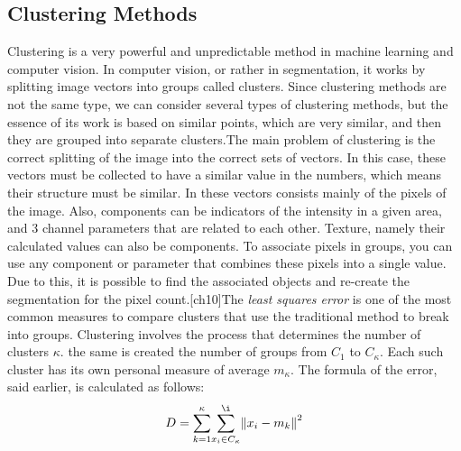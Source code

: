 \vspace{-0.3cm}

\subsection{Clustering Methods}\label{sec:3.4.2}
\vspace{-0.5cm}
\noindent Clustering is a very powerful and unpredictable method in machine learning and computer vision. In computer vision, or rather in segmentation, it works by splitting image vectors into groups called clusters. Since clustering methods are not the same type, we can consider several types of clustering methods, but the essence of its work is based on similar points, which are very similar, and then they are grouped into separate clusters.The main problem of clustering is the correct splitting of the image into the correct sets of vectors. In this case, these vectors must be collected to have a similar value in the numbers, which means their structure must be similar. In these vectors consists mainly of the pixels of the image. Also, components can be indicators of the intensity in a given area, and 3 channel parameters that are related to each other. Texture, namely their calculated values can also be components. To associate pixels in groups, you can use any component or parameter that combines these pixels into a single value. Due to this, it is possible to find the associated objects and re-create the segmentation for the pixel count.[ch10]The\textit{ least squares error} is one of the most common measures to compare clusters that use the traditional method to break into groups. Clustering involves the process that determines the number of clusters $\kappa$. the same is created the number of groups from $C_{1}$ to $C_{\kappa}$. Each such cluster has its own personal measure of average $m_{\kappa}$. The formula of the error, said earlier, is calculated as follows:
\begin{equation}
D = {\sum\limits_{k=1}^{\kappa}} {\sum\limits_{x_i \in{C_{\kappa}}}^{\i}}{\Vert x_i - m_k \Vert}^{2}
\end{equation}

